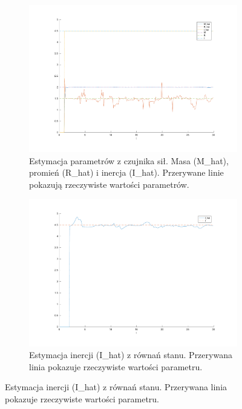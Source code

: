 \documentclass[a4paper, 10pt]{article}
\begin{document}
\begin{figure}
\begin{subfigure}{.5\textwidth}
		\includegraphics[width=\linewidth]{kompensacja_c}
		\caption{Estymacja parametrów z czujnika sił. Masa (M\_hat), promień (R\_hat) i inercja (I\_hat). Przerywane linie pokazują rzeczywiste wartości parametrów.}
		\label{fig:kompensacja_c}
	\end{subfigure}%
	\begin{subfigure}{.5\textwidth}
		\centering
		\includegraphics[width=\linewidth]{kompensacja_r}
		\caption{Estymacja inercji (I\_hat) z równań stanu. Przerywana linia pokazuje rzeczywiste wartości parametru.}
		\label{fig:kompensacja_r}
	\end{subfigure}


\end{figure}
\end{document}
